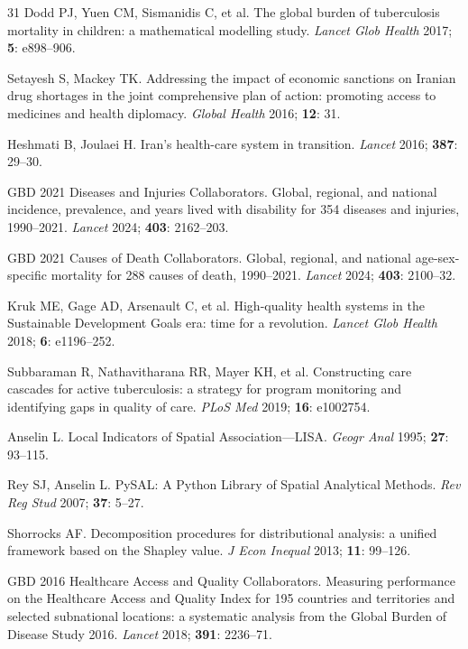 \documentclass[12pt]{article}
\begin{document}
\begin{thebibliography}{31}
Dodd PJ, Yuen CM, Sismanidis C, et al. The global burden of tuberculosis mortality in children: a mathematical modelling study. \textit{Lancet Glob Health} 2017; \textbf{5}: e898--906.

Setayesh S, Mackey TK. Addressing the impact of economic sanctions on Iranian drug shortages in the joint comprehensive plan of action: promoting access to medicines and health diplomacy. \textit{Global Health} 2016; \textbf{12}: 31.

Heshmati B, Joulaei H. Iran's health-care system in transition. \textit{Lancet} 2016; \textbf{387}: 29--30.

GBD 2021 Diseases and Injuries Collaborators. Global, regional, and national incidence, prevalence, and years lived with disability for 354 diseases and injuries, 1990--2021. \textit{Lancet} 2024; \textbf{403}: 2162--203.

GBD 2021 Causes of Death Collaborators. Global, regional, and national age-sex-specific mortality for 288 causes of death, 1990--2021. \textit{Lancet} 2024; \textbf{403}: 2100--32.

Kruk ME, Gage AD, Arsenault C, et al. High-quality health systems in the Sustainable Development Goals era: time for a revolution. \textit{Lancet Glob Health} 2018; \textbf{6}: e1196--252.

Subbaraman R, Nathavitharana RR, Mayer KH, et al. Constructing care cascades for active tuberculosis: a strategy for program monitoring and identifying gaps in quality of care. \textit{PLoS Med} 2019; \textbf{16}: e1002754.

Anselin L. Local Indicators of Spatial Association---LISA. \textit{Geogr Anal} 1995; \textbf{27}: 93--115.

Rey SJ, Anselin L. PySAL: A Python Library of Spatial Analytical Methods. \textit{Rev Reg Stud} 2007; \textbf{37}: 5--27.

Shorrocks AF. Decomposition procedures for distributional analysis: a unified framework based on the Shapley value. \textit{J Econ Inequal} 2013; \textbf{11}: 99--126.

GBD 2016 Healthcare Access and Quality Collaborators. Measuring performance on the Healthcare Access and Quality Index for 195 countries and territories and selected subnational locations: a systematic analysis from the Global Burden of Disease Study 2016. \textit{Lancet} 2018; \textbf{391}: 2236--71.


\end{thebibliography}
\end{document}
